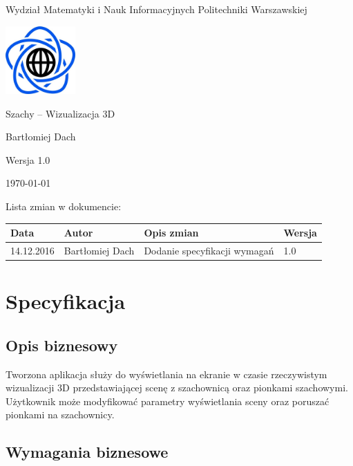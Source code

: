 \documentclass[10pt,a4paper]{article}
\begin{document}
\begin{titlepage}
	\centering
	{\Large Wydział Matematyki i Nauk Informacyjnych Politechniki Warszawskiej \par}
	\vspace{1cm}
	\includegraphics[width=0.2\textwidth]{logo.png} \par
	\vspace{5cm}
	{\LARGE Szachy -- Wizualizacja 3D \par}
	\vspace{0.5cm}
	{\Large Bartłomiej Dach \par}
	\vspace{1.5cm}
	{\Large Wersja 1.0 \par}
	\vspace{1.5cm}
	{\Large \today \par}
\end{titlepage}
Lista zmian w dokumencie:
\begin{table}[H]
\def\arraystretch{1.5}
\begin{tabularx}{\textwidth}{|l|l|X|l|}
	\hline
	\textbf{Data} & \textbf{Autor} & \textbf{Opis zmian} & \textbf{Wersja} \\
	\hline
	14.12.2016 & Bartłomiej Dach & Dodanie specyfikacji wymagań & 1.0 \\
	\hline
\end{tabularx}
\end{table}

\tableofcontents
\newpage

\section{Specyfikacja}

\subsection{Opis biznesowy}
Tworzona aplikacja służy do wyświetlania na ekranie w czasie rzeczywistym wizualizacji 3D przedstawiającej scenę z szachownicą oraz pionkami szachowymi. Użytkownik może modyfikować parametry wyświetlania sceny oraz poruszać pionkami na szachownicy.

\subsection{Wymagania biznesowe}
%
\end{document}
